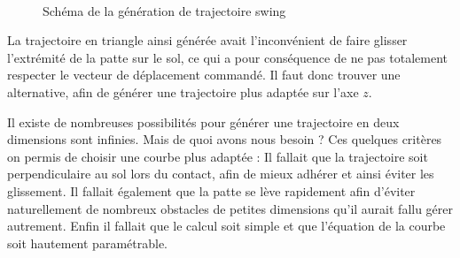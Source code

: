 \documentclass{tnreport}
\begin{document}
\begin{figure}[h]
\centering
{}\qquad
{}\\
\caption{Schéma de la génération de trajectoire swing}
\label{fig:swing}
\end{figure}

La trajectoire en triangle ainsi générée avait l'inconvénient de faire glisser l'extrémité de la patte sur le sol, ce qui a pour conséquence de ne pas totalement respecter le vecteur de déplacement commandé. Il faut donc trouver une alternative, afin de générer une trajectoire plus adaptée sur l'axe $z$.

Il existe de nombreuses possibilités pour générer une trajectoire en deux dimensions sont infinies. Mais de quoi avons nous besoin ? Ces quelques critères on permis de choisir une courbe plus adaptée : 
Il fallait que la trajectoire soit perpendiculaire au sol lors du contact, afin de mieux adhérer et ainsi éviter les glissement. Il fallait également que la patte se lève rapidement afin d'éviter naturellement de nombreux obstacles de petites dimensions qu'il aurait fallu gérer autrement. Enfin il fallait que le calcul soit simple et que l'équation de la courbe soit hautement paramétrable. 
\end{document}
